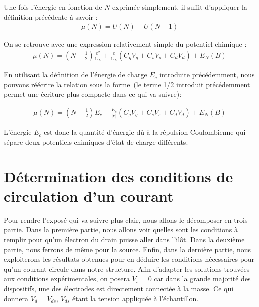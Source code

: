 Une fois l'énergie en fonction de $N$ exprimée simplement, il suffit d'appliquer la définition précédente à savoir :
\begin{eqnarray}
\mu(N) = U(N) - U(N-1) \nonumber
\end{eqnarray}

On se retrouve avec une expression relativement simple du potentiel chimique :
\begin{eqnarray}
\mu(N) = (N-\frac{1}{2})\frac{e^2}{C_{\Sigma}}
+ 
\frac{e}{C_{\Sigma}}(C_gV_g + C_sV_s + C_dV_d)
+
E_N(B)
\end{eqnarray}

En utilisant la définition de l'énergie de charge $E_c$ introduite précédemment, nous pouvons réécrire la relation sous la forme~(le terme 1/2 introduit précédemment permet une écriture plus compacte dans ce qui va suivre):

\begin{eqnarray}
\mu(N) = (N-\frac{1}{2})E_c
- 
\frac{E_c}{|e|}(C_gV_g + C_sV_s + C_dV_d)
+
E_N(B)
\label{pot_chim}
\end{eqnarray}

L'énergie $E_c$ est donc la quantité d'énergie d\^u à la répulsion Coulombienne qui sépare deux potentiels chimiques d'état de charge différents.


\section{Détermination des conditions de circulation d'un courant}
Pour rendre l'exposé qui va suivre plus clair, nous allons le décomposer en trois partie. Dans la première partie, nous allons voir quelles sont les conditions à remplir pour qu'un électron du drain puisse aller dans l'il\^ot. Dans la deuxième partie, nous ferrons de m\^eme pour la source. Enfin, dans la dernière partie, nous exploiterons les résultats obtenues pour en déduire les conditions nécessaires pour qu'un courant circule dans notre structure. Afin d'adapter les solutions trouvées aux conditions expérimentales, on posera $V_s = 0$ car dans la grande majorité des dispositifs, une des électrodes est directement connectée à la masse. Ce qui donnera $V_d=V_{ds}$, $V_{ds}$ étant la tension appliquée à l'échantillon.

